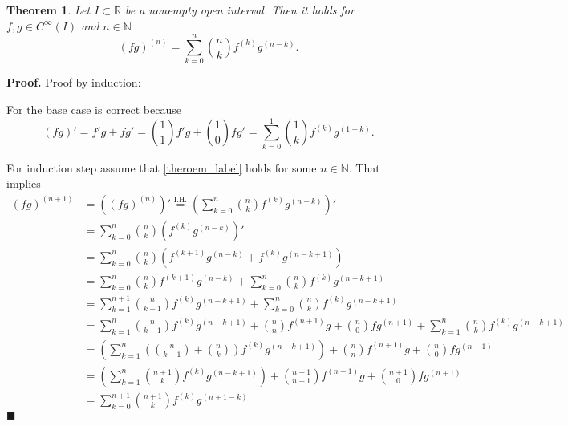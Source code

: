 \documentclass[a4paper, 11pt]{article}
\newtheorem{theorem}{Theorem}
\newenvironment{pr}{\textbf{Proof.}}{\hfill\textbf{$\blacksquare$}}
\begin{document}
\begin{theorem}\label{theroem_label}
Let $I \subset \mathbb{R}$ be a nonempty open interval.
Then it holds for $f, g \in C^{\infty}(I)$ and $n \in \mathbb{N}$
\[(fg)^{(n)} = \sum_{k=0}^{n}\binom{n}{k}f^{(k)}g^{(n-k)}.\]
\end{theorem}
\noindent
\begin{pr}
    Proof by induction:

    For the base case is correct because 
    \[(fg)' = f'g + fg' = \binom{1}{1}f'g + \binom{1}{0}fg' = \sum_{k=0}^{1}\binom{1}{k}f^{(k)}g^{(1-k)}.\]

    For induction step assume that \eqref{theroem_label} holds for some $n \in \mathbb{N}$. That implies
    \begin{align*}
        (fg)^{(n+1)} &= \left((fg)^{(n)}\right)' \stackrel{\text{I.H.}}{=} \left(\sum_{k=0}^{n}\binom{n}{k}f^{(k)}g^{(n-k)}\right)'\\
        &= \sum_{k=0}^{n}\binom{n}{k}\left(f^{(k)}g^{(n-k)}\right)'\\
        &= \sum_{k=0}^{n}\binom{n}{k}\left(f^{(k+1)}g^{(n-k)}+f^{(k)}g^{(n-k+1)}\right)\\
        &= \sum_{k=0}^{n}\binom{n}{k}f^{(k+1)}g^{(n-k)} + \sum_{k=0}^{n}\binom{n}{k}f^{(k)}g^{(n-k+1)}\\
        &= \sum_{k=1}^{n+1}\binom{n}{k-1}f^{(k)}g^{(n-k+1)} + \sum_{k=0}^{n}\binom{n}{k}f^{(k)}g^{(n-k+1)}\\
        &= \sum_{k=1}^{n}\binom{n}{k-1}f^{(k)}g^{(n-k+1)} + \binom{n}{n}f^{(n+1)}g + \binom{n}{0}f g^{(n+1)}+ \sum_{k=1}^{n}\binom{n}{k}f^{(k)}g^{(n-k+1)}\\
        &= \left(\sum_{k=1}^{n}\left(\binom{n}{k-1} + \binom{n}{k}\right)f^{(k)}g^{(n-k+1)}\right) + \binom{n}{n}f^{(n+1)}g + \binom{n}{0}f g^{(n+1)}\\
        &= \left(\sum_{k=1}^{n}\binom{n+1}{k}f^{(k)}g^{(n-k+1)}\right) + \binom{n+1}{n+1}f^{(n+1)}g + \binom{n+1}{0}f g^{(n+1)}\\
        &= \sum_{k=0}^{n+1}\binom{n+1}{k}f^{(k)}g^{(n+1-k)}
    \end{align*}
\end{pr}
\end{document}
